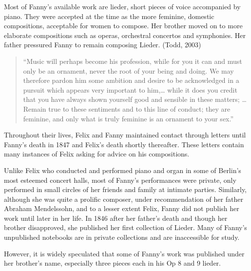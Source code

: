 \documentclass[12pt,twoside]{reedthesis}
\theoremstyle{definition}
\theoremstyle{definition}
\theoremstyle{definition}
\theoremstyle{remark}
\begin{document}
Most of Fanny's available work are lieder, short pieces of voice
accompanied by piano. They were accepted at the time as the more
feminine, domestic compositions, acceptable for women to compose. Her
brother moved on to more elaborate compositions such as operas,
orchestral concertos and symphonies. Her father pressured Fanny to
remain composing Lieder. (Todd, 2003)
\begin{quote}
``Music will perhaps become his profession, while for you it can and
must only be an ornament, never the root of your being and doing. We may
therefore pardon him some ambition and desire to be acknowledged in a
pursuit which appears very important to him,\ldots{} while it does you
credit that you have always shown yourself good and sensible in these
matters; \ldots{} Remain true to these sentiments and to this line of
conduct; they are feminine, and only what is truly feminine is an
ornament to your sex.''
\end{quote}
Throughout their lives, Felix and Fanny maintained contact through
letters until Fanny's death in 1847 and Felix's death shortly
thereafter. These letters contain many instances of Felix asking for
advice on his compositions.

Unlike Felix who conducted and performed piano and organ in some of
Berlin's most esteemed concert halls, most of Fanny's performances were
private, only performed in small circles of her friends and family at
intimate parties. Similarly, although she was quite a prolific composer,
under recommendation of her father Abraham Mendelssohn, and to a lesser
extent Felix, Fanny did not publish her work until later in her life. In
1846 after her father's death and though her brother disapproved, she
published her first collection of Lieder. Many of Fanny's unpublished
notebooks are in private collections and are inaccessible for study.

However, it is widely speculated that some of Fanny's work was published
under her brother's name, especially three pieces each in his Op 8 and 9
lieder.
\end{document}
